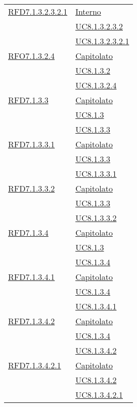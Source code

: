 \begin{longtable}{|>{\centering}m{5cm}|m{5cm}<{\centering}|}
\hyperlink{RFD7.1.3.2.3.2.1}{RFD7.1.3.2.3.2.1} & \hyperlink{Interno}{Interno}\\
& \hyperref[UC8.1.3.2.3.2]{UC8.1.3.2.3.2}\\
& \hyperref[UC8.1.3.2.3.2.1]{UC8.1.3.2.3.2.1}\\ \hline

\hyperlink{RFO7.1.3.2.4}{RFO7.1.3.2.4} & \hyperlink{Capitolato}{Capitolato}\\
& \hyperref[UC8.1.3.2]{UC8.1.3.2}\\
& \hyperref[UC8.1.3.2.4]{UC8.1.3.2.4}\\ \hline

\hyperlink{RFD7.1.3.3}{RFD7.1.3.3} & \hyperlink{Capitolato}{Capitolato}\\
& \hyperref[UC8.1.3]{UC8.1.3}\\
& \hyperref[UC8.1.3.3]{UC8.1.3.3}\\ \hline

\hyperlink{RFD7.1.3.3.1}{RFD7.1.3.3.1} & \hyperlink{Capitolato}{Capitolato}\\
& \hyperref[UC8.1.3.3]{UC8.1.3.3}\\
& \hyperref[UC8.1.3.3.1]{UC8.1.3.3.1}\\ \hline

\hyperlink{RFD7.1.3.3.2}{RFD7.1.3.3.2} & \hyperlink{Capitolato}{Capitolato}\\
& \hyperref[UC8.1.3.3]{UC8.1.3.3}\\
& \hyperref[UC8.1.3.3.2]{UC8.1.3.3.2}\\ \hline

\hyperlink{RFD7.1.3.4}{RFD7.1.3.4} & \hyperlink{Capitolato}{Capitolato}\\
& \hyperref[UC8.1.3]{UC8.1.3}\\
& \hyperref[UC8.1.3.4]{UC8.1.3.4}\\ \hline

\hyperlink{RFD7.1.3.4.1}{RFD7.1.3.4.1} & \hyperlink{Capitolato}{Capitolato}\\
& \hyperref[UC8.1.3.4]{UC8.1.3.4}\\
& \hyperref[UC8.1.3.4.1]{UC8.1.3.4.1}\\ \hline

\hyperlink{RFD7.1.3.4.2}{RFD7.1.3.4.2} & \hyperlink{Capitolato}{Capitolato}\\
& \hyperref[UC8.1.3.4]{UC8.1.3.4}\\
& \hyperref[UC8.1.3.4.2]{UC8.1.3.4.2}\\ \hline

\hyperlink{RFD7.1.3.4.2.1}{RFD7.1.3.4.2.1} & \hyperlink{Capitolato}{Capitolato}\\
& \hyperref[UC8.1.3.4.2]{UC8.1.3.4.2}\\
& \hyperref[UC8.1.3.4.2.1]{UC8.1.3.4.2.1}\\ \hline


\end{longtable}
